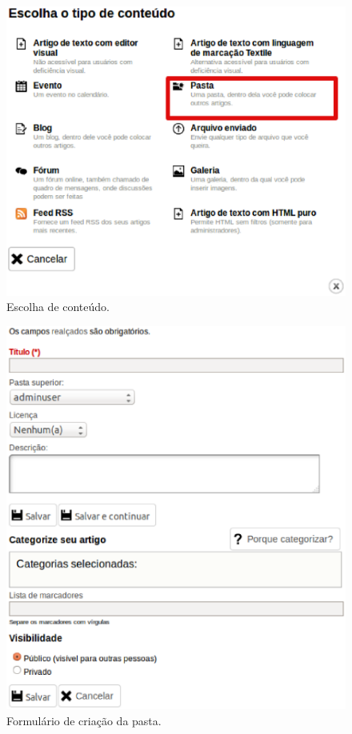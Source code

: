 \begin{figure}[H]
     \centering
       \includegraphics[keepaspectratio=true,scale=0.49]{figuras/escolhaConteudo.eps}
     \caption{Escolha de conteúdo.}
     \label{fig:GerenciamentoConteudo}
\end{figure}

\begin{figure}[H]
     \centering
       \includegraphics[keepaspectratio=true,scale=0.49]{figuras/criandoPasta.eps}
     \caption{Formulário de criação da pasta.}
     \label{fig:FormCriacaoPasta}
\end{figure}

